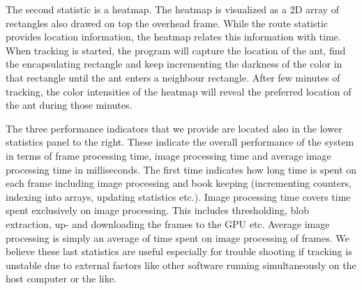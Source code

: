 The second statistic is a heatmap. The heatmap is visualized as a 2D array of rectangles also drawed on top the overhead frame. While the route statistic provides location information, the heatmap relates this information with time. When tracking is started, the program will capture the location of the ant, find the encapsulating rectangle and keep incrementing the darkness of the color in that rectangle until the ant enters a neighbour rectangle. After few minutes of tracking, the color intensities of the heatmap will reveal the preferred location of the ant during those minutes.

The three performance indicators that we provide are located also in the lower statistics panel to the right. These indicate the overall performance of the system in terms of frame processing time, image processing time and average image processing time in milliseconds. The first time indicates how long time is spent on each frame including image processing and book keeping (incrementing counters, indexing into arrays, updating statistics etc.). Image processing time covers time spent exclusively on image processing. This includes thresholding, blob extraction, up- and downloading the frames to the GPU etc. Average image processing is simply an average of time spent on image processing of frames. We believe these last statistics are useful especially for trouble shooting if tracking is unstable due to external factors like other software running simultaneously on the host computer or the like.

